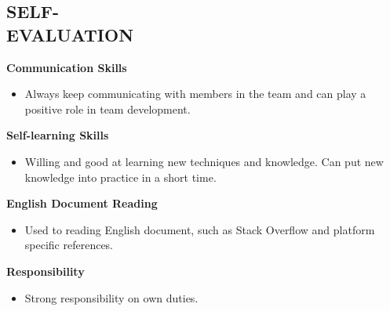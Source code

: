 \documentclass[margin]{res}
\begin{document}
\begin{resume}
\section{SELF- \\ EVALUATION}
{\bf Communication Skills}
\begin{itemize}
\item Always keep communicating with members in the team and can play a positive role in team development.
\end{itemize}
{\bf Self-learning Skills}
\begin{itemize}
\item Willing and good at learning new techniques and knowledge. Can put new knowledge into practice in a short time.
\end{itemize}
{\bf English Document Reading}
\begin{itemize}
\item Used to reading English document, such as Stack Overflow and platform specific references.
\end{itemize}
{\bf Responsibility}
\begin{itemize}
\item Strong responsibility on own duties.
\end{itemize}
\end{resume}
\end{document}
